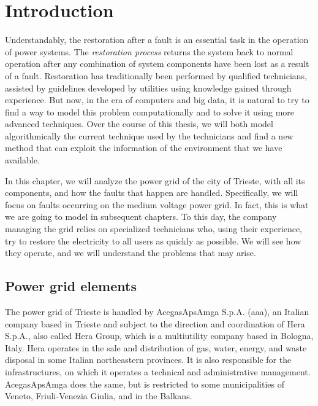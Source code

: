 \chapter{Introduction}


Understandably, the restoration after a fault is an essential task in the operation of power systems. The \emph{restoration process} returns the system back to normal operation after any combination of system components have been lost as a result of a fault. Restoration has traditionally been performed by qualified technicians, assisted by guidelines developed by utilities using knowledge gained through experience. But now, in the era of computers and big data, it is natural to try to find a way to model this problem computationally and to solve it using more advanced techniques. Over the course of this thesis, we will both model algorithmically the current technique used by the technicians and find a new method that can exploit the information of the environment that we have available.

In this chapter, we will analyze the power grid of the city of Trieste, with all its components, and how the faults that happen are handled. Specifically, we will focus on faults occurring on the medium voltage power grid. In fact, this is what we are going to model in subsequent chapters. To this day, the company managing the grid relies on specialized technicians who, using their experience, try to restore the electricity to all users as quickly as possible. We will see how they operate, and we will understand the problems that may arise.


\section{Power grid elements}

The power grid of Trieste is handled by AcegasApsAmga S.p.A. (\acrshort{aaa}), an Italian company based in Trieste and subject to the direction and coordination of Hera S.p.A., also called Hera Group, which is a multiutility company based in Bologna, Italy. Hera operates in the sale and distribution of gas, water, energy, and waste disposal in some Italian northeastern provinces. It is also responsible for the infrastructures, on which it operates a technical and administrative management. AcegasApsAmga does the same, but is restricted to some municipalities of Veneto, Friuli-Venezia Giulia, and in the Balkans.

